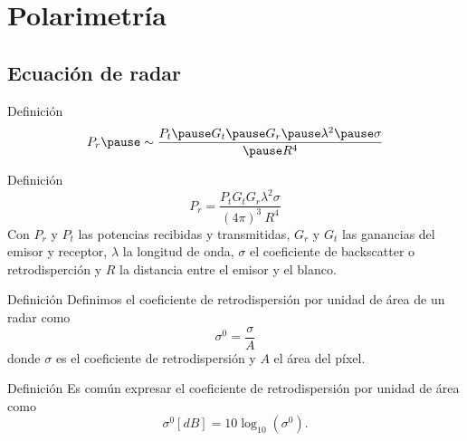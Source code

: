\section{Polarimetría}

\subsection{Ecuación de radar}

\begin{frame}{} \vskip0cm
    \begin{block}{Definición}
      \begin{equation}
        P_r \pause \sim \frac{ P_t \pause G_t \pause G_r \pause \lambda^2 \pause \sigma}{\pause R^4}
      \end{equation}
    \end{block}
\end{frame}

\begin{frame}{} \vskip0cm
    \begin{block}{Definición}
      \begin{equation}
        P_r = \frac{ P_t  G_t  G_r  \lambda^2  \sigma}{ (4\pi)^3 \ R^4}
      \end{equation}
      Con $P_r$ y $P_t$ las potencias recibidas y transmitidas, $G_r$ y $G_t$ las ganancias del emisor y receptor, $\lambda$ la longitud de onda, $\sigma$ el coeficiente de backscatter o retrodisperción y $R$ la distancia entre el emisor y el blanco.
    \end{block}
\end{frame}

\begin{frame}{} \vskip0cm

  \begin{block}{Definición}
    Definimos el coeficiente de retrodispersión por unidad de área de un radar como
    \begin{equation}
      \sigma^0 = \frac{\sigma}{A}
    \end{equation}
    donde $\sigma$ es el coeficiente de retrodispersión y $A$ el área del píxel.
  \end{block}
  \pause
    \begin{block}{Definición}
      Es común expresar el coeficiente de retrodispersión por unidad de área como
      \begin{equation}
        \sigma^0 [dB] = 10\log_{10}(\sigma^0).
      \end{equation}
    \end{block}
\end{frame}

